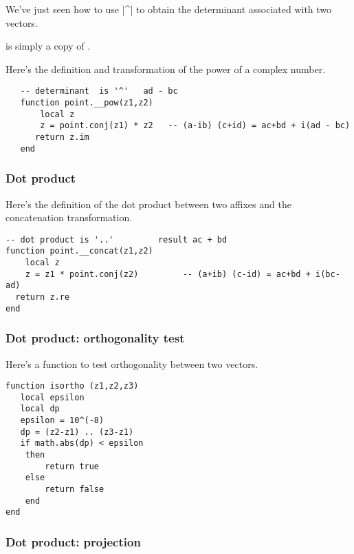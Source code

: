 We've just seen how to use |^| to obtain the determinant associated with two vectors. 

  is simply a copy of   .

Here's the definition and transformation of the power of a complex number.

\begin{verbatim}
   -- determinant  is '^'   ad - bc
   function point.__pow(z1,z2)
       local z
       z = point.conj(z1) * z2   -- (a-ib) (c+id) = ac+bd + i(ad - bc)
      return z.im
   end
\end{verbatim}


\subsubsection{Dot product} %
\label{ssub:scalar_product}

Here's the definition of the dot product between two affixes and the concatenation transformation. 

\begin{verbatim}
-- dot product is '..'         result ac + bd
function point.__concat(z1,z2)
    local z
    z = z1 * point.conj(z2)         -- (a+ib) (c-id) = ac+bd + i(bc-ad) 
  return z.re
end
\end{verbatim}



\subsubsection{Dot product: orthogonality test } %
\label{ssub:scalar_product_orthogonality_test}

Here's a function   to test orthogonality between two vectors.

\begin{verbatim}
function isortho (z1,z2,z3)
   local epsilon
   local dp
   epsilon = 10^(-8)
   dp = (z2-z1) .. (z3-z1)
   if math.abs(dp) < epsilon 
    then 
        return true
    else 
        return false
    end
end
\end{verbatim}


\subsubsection{Dot product: projection} %
\label{ssub:scalar_product_projection}

